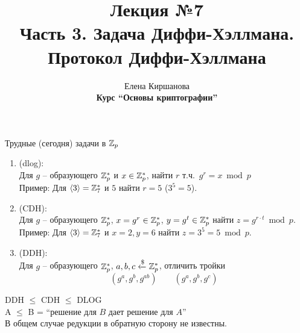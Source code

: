 \documentclass[usenames,dvipsnames,8pt,aspectratio=169]{beamer}
\title{Лекция №7 \\[10pt]
	Часть 3. Задача Диффи-Хэллмана. Протокол Диффи-Хэллмана}
\date{ Елена Киршанова \\  \textbf{Курс ``Основы криптографии''} \\  }
\begin{document}
	
\begin{frame}
	\titlepage
\end{frame}



\begin{frame}{Трудные (сегодня) задачи в ${{\mathbb Z}}_p$}
	\large
	\begin{enumerate}
		\itemsep 10pt
		\item {\color{Orange}{Задача дискретного логарифма} (dlog):} \\[3pt]
			Для $g$ -- образующего ${{\mathbb Z}}_p^\ast$ и $x \in {{\mathbb Z}}_p^\ast$, найти $r$ т.ч.\ $g^r = x \bmod p$ \\[5pt]
			Пример: Для $\langle 3 \rangle =  {{\mathbb Z}}_7^\ast$ и $5$ найти $r = 5$ ($3^5 = 5$).

		\item  {\color{Orange}{Задача Diffie-Hellman (вычислительная версия)} (CDH):} \\[3pt]
			Для $g$ -- образующего ${{\mathbb Z}}_p^\ast$,  $x = g^r \in {{\mathbb Z}}_p^\ast$, $y = g^t \in {{\mathbb Z}}_p^\ast$ найти $z = g^{r\cdot t} \bmod p$. \\[5pt]
			Пример: Для $\langle 3 \rangle  = {{\mathbb Z}}_7^\ast$ и $x = 2, y = 6 $ найти $z = 3^5 = 5 \bmod p$.
			
		\item {\color{Orange}{Задача принятия решения  Diffie-Hellman} (DDH):} \\
		Для $g$ -- образующего ${{\mathbb Z}}_p^\ast$, $a, b, c \xleftarrow{\$} {{\mathbb Z}}_p^\ast$, отличить тройки
		\[
			(g^a, g^b, g^{ab}) \quad \quad (g^a, g^b, g^c)
		\]
		
		
	\end{enumerate}
\Large
\centering
\pause
\vspace{20pt}
{\color{Orange}
	DDH $\leq$ CDH $\leq$ DLOG \\[5pt]
}
A $\leq$ B = ``решение для $B$ дает решение для $A$'' \\[5pt]

В общем случае редукции в обратную сторону не известны.
\end{frame}
\end{document}
